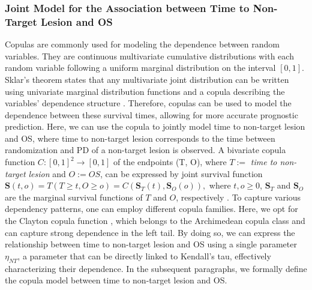 \subsubsection{Joint Model for the Association between Time to Non-Target Lesion and OS} \label{sec:NT}
Copulas are commonly used for modeling the dependence between random variables. They are continuous multivariate cumulative distributions with each random variable following a uniform marginal distribution on the interval $[0, 1]$.
Sklar's theorem states that any multivariate joint distribution can be written using univariate marginal distribution functions and a copula describing the variables' dependence structure \citep{sklar1959fonctions}. Therefore, copulas can be used to model the dependence between these survival times, allowing for more accurate prognostic prediction.
Here, we can use the copula to jointly model time to non-target lesion and OS, where time to non-target lesion corresponds to the time between randomization and \ac{PD} of a non-target lesion is observed. A bivariate copula function $C:[0, 1]^2 \rightarrow [0, 1]$ of the endpoints (T, O), where $T:=$ \textit{time to non-target lesion} and $O:= OS$, can be expressed by joint survival function $\boldsymbol{S}(t, o) = T(T \geq t, O \geq o) = C(\boldsymbol{S}_{T}(t), \boldsymbol{S}_{O}(o)),$
where  $t,o \geq 0$, $\boldsymbol{S}_T$ and $\boldsymbol{S}_O$ are the marginal survival functions of $T$ and $O$, respectively \citep{weber2020statistical}. To capture various dependency patterns, one can employ different copula families. Here, we opt for the Clayton copula function \citep{clayton1978model}, which belongs to the Archimedean copula class and can capture strong dependence in the left tail. By doing so, we can express the relationship between time to non-target lesion and \ac{OS} using a single parameter $\eta_{NT}$, a parameter that can be directly linked to Kendall's tau, effectively characterizing their dependence. In the subsequent paragraphs, we formally define the copula model between time to non-target lesion and OS.


